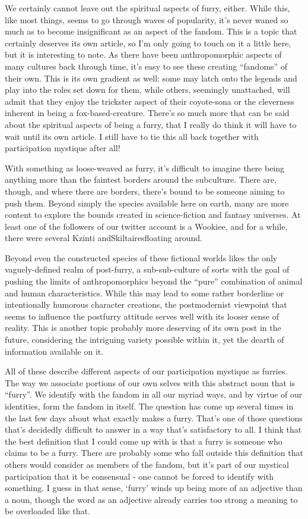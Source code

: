 We certainly cannot leave out the spiritual aspects of furry, either. While this, like most things, seems to go through waves of popularity, it's never waned so much as to become insignificant as an aspect of the fandom. This is a topic that certainly deserves its own article, so I'm only going to touch on it a little here, but it is interesting to note. As there have been anthropomorphic aspects of many cultures back through time, it's easy to see these creating ``fandoms'' of their own. This is its own gradient as well: some may latch onto the legends and play into the roles set down for them, while others, seemingly unattached, will admit that they enjoy the trickster aspect of their coyote-sona or the cleverness inherent in being a fox-based-creature. There's so much more that can be said about the spiritual aspects of being a furry, that I really do think it will have to wait until its own article. I still have to tie this all back together with participation mystique after all!

With something as loose-weaved as furry, it's difficult to imagine there being anything more than the faintest borders around the subculture. There are, though, and where there are borders, there's bound to be someone aiming to push them. Beyond simply the species available here on earth, many are more content to explore the bounds created in science-fiction and fantasy universes. At least one of the followers of our twitter account is a Wookiee, and for a while, there were several Kzinti andSkiltairesfloating around.

Beyond even the constructed species of these fictional worlds likes the only vaguely-defined realm of post-furry, a sub-sub-culture of sorts with the goal of pushing the limits of anthropomorphics beyond the ``pure'' combination of animal and human characteristics. While this may lead to some rather borderline or intentionally humorous character creations, the postmodernist viewpoint that seems to influence the postfurry attitude serves well with its looser sense of reality. This is another topic probably more deserving of its own post in the future, considering the intriguing variety possible within it, yet the dearth of information available on it.

All of these describe different aspects of our participation mystique as furries. The way we associate portions of our own selves with this abstract noun that is ``furry''. We identify with the fandom in all our myriad ways, and by virtue of our identities, form the fandom in itself. The question has come up several times in the last few days about what exactly makes a furry. That's one of those questions that's decidedly difficult to answer in a way that's satisfactory to all. I think that the best definition that I could come up with is that a furry is someone who claims to be a furry. There are probably some who fall outside this definition that others would consider as members of the fandom, but it's part of our mystical participation that it be consensual - one cannot be forced to identify with something. I guess in that sense, `furry' winds up being more of an adjective than a noun, though the word as an adjective already carries too strong a meaning to be overloaded like that.

